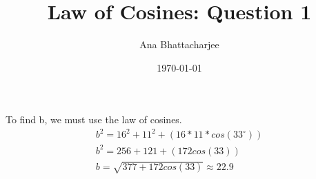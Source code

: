 \documentclass{article}
\begin{document}
\title{Law of Cosines: Question 1}
\author{Ana Bhattacharjee}
\date{\today}
\maketitle{}
\begin{center}
To find b, we must use the law of cosines.
\begin{align}
  b^2 = 16^2 + 11^2 + (16*11*cos(33^{\circ})) \\
  b^2 = 256 + 121 + (172cos(33)) \\
  b = \sqrt{377 + 172cos(33)} \approx 22.9
\end{align}
\end{center}
\end{document}

